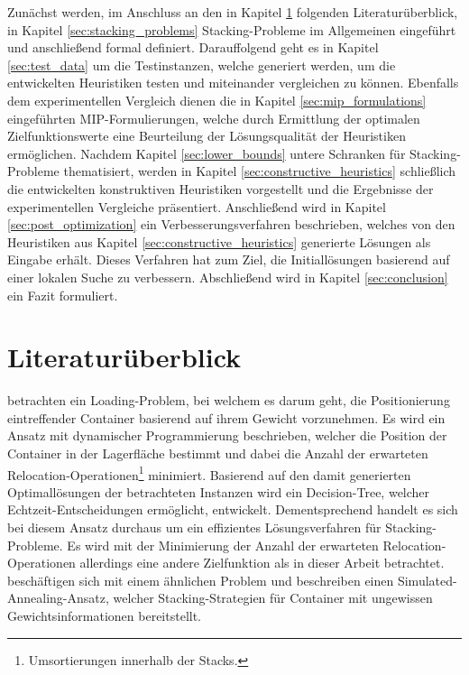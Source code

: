 Zunächst werden, im Anschluss an den in Kapitel \ref{sec:literature_review} folgenden Literaturüberblick,
in Kapitel \ref{sec:stacking_problems} Stacking-Probleme im Allgemeinen eingeführt und anschließend formal definiert.
Da­r­auf­fol­gend geht es in Kapitel \ref{sec:test_data} um die Testinstanzen, welche generiert werden,
um die entwickelten Heuristiken testen und miteinander vergleichen zu können.
Ebenfalls dem experimentellen Vergleich dienen die in Kapitel \ref{sec:mip_formulations} eingeführten MIP-Formulierungen, welche durch Ermittlung der optimalen Zielfunktionswerte eine Beurteilung der Lösungsqualität der Heuristiken ermöglichen.
Nachdem Kapitel \ref{sec:lower_bounds} untere Schranken für Stacking-Probleme thematisiert,
werden in Kapitel \ref{sec:constructive_heuristics} schließlich die entwickelten konstruktiven Heuristiken vorgestellt und die Ergebnisse der experimentellen Vergleiche präsentiert. Anschließend wird in Kapitel \ref{sec:post_optimization} ein Verbesserungsverfahren beschrieben, welches von den Heuristiken aus Kapitel \ref{sec:constructive_heuristics} generierte Lösungen als Eingabe erhält. Dieses Verfahren hat zum Ziel, die Initiallösungen basierend auf einer
lokalen Suche zu verbessern. Abschließend wird in Kapitel \ref{sec:conclusion} ein Fazit formuliert.

\vfill
\pagebreak

\section{Literaturüberblick}
\label{sec:literature_review}

\citet{Kim2000} betrachten ein Loading-Problem, bei welchem es darum geht, die Positionierung eintreffender
Container basierend auf ihrem Gewicht vorzunehmen. Es wird ein Ansatz mit dynamischer Programmierung beschrieben,
welcher die Position der Container in der Lagerfläche bestimmt und dabei die Anzahl der erwarteten
Relocation-Operationen\footnote{Umsortierungen innerhalb der Stacks.} minimiert.
Basierend auf den damit generierten Optimallösungen der betrachteten Instanzen wird ein Decision-Tree, welcher Echtzeit-Entscheidungen ermöglicht, entwickelt.
Dementsprechend handelt es sich bei diesem Ansatz durchaus um ein effizientes Lösungsverfahren für Stacking-Probleme.
Es wird mit der Minimierung der Anzahl der erwarteten Relocation-Operationen allerdings eine andere Zielfunktion
als in dieser Arbeit betrachtet.\newline
\citet{Kang2006} beschäftigen sich mit einem ähnlichen Problem und beschreiben einen Simulated-Annealing-Ansatz,
welcher Stacking-Strategien für Container mit ungewissen Gewichtsinformationen bereitstellt.

